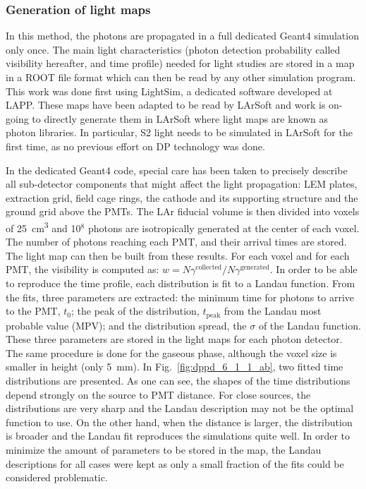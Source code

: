 \subsubsection{Generation of light maps}
\label{subsec:fddp-pd-6.1.1}

In this method, the photons are propagated in a full dedicated Geant4 simulation only once. The main light characteristics (photon detection probability called visibility hereafter, and time profile) needed for light studies are stored in a map in a ROOT \cite{root} file format which can then be read by any other simulation program. This work was done first using LightSim, a dedicated software developed at LAPP. These maps have been adapted to be read by LArSoft and work is on-going to directly generate them in LArSoft where light maps are known as photon libraries. In particular, S2 light needs to be simulated in LArSoft for the first time, as no previous effort on DP technology was done.

In the dedicated Geant4 code, special care has been taken to precisely describe all sub-detector components that might affect the light propagation: LEM plates, extraction grid, field cage rings, the cathode and its supporting structure and the ground grid above the PMTs. The LAr fiducial volume is then divided into voxels of \SI{25}{cm^3} and \num{10}$^8$ photons are isotropically generated at the center of each voxel. The number of photons reaching each PMT, and their arrival times are stored. The light map can then be built from these results. For each voxel and for each PMT, the visibility is computed as: $w=N\gamma^{\textrm{collected}}/N\gamma^{\textrm{generated}}$. In order to be able to reproduce the time profile, each distribution is fit to a Landau function. From the fits, three parameters are extracted: the minimum time for photons to arrive to the PMT, $t_0$; the peak of the distribution, $t_{\textrm{peak}}$ from the Landau most probable value (MPV); and the distribution spread, the $\sigma$ of the Landau function. These three parameters are stored in the light maps for each photon detector. The same procedure is done for the gaseous phase, although the voxel size is smaller in height (only \SI{5}{mm}). In Fig.~\ref{fig:dppd_6_1_1_ab}, two fitted time distributions are presented. As one can see, the shapes of the time distributions depend strongly on the source to PMT distance. For close sources, the distributions are very sharp and the Landau description may not be the optimal function to use. On the other hand, when the distance is larger, the distribution is broader and the Landau fit reproduces the simulations quite well. In order to minimize the amount of parameters to be stored in the map, the Landau descriptions for all cases were kept as only a small fraction of the fits could be considered problematic.

